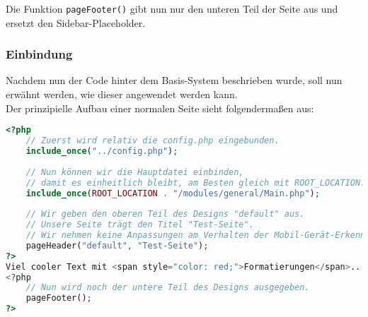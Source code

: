 
Die Funktion \texttt{pageFooter()} gibt nun nur den unteren Teil der Seite aus und ersetzt den Sidebar-Placeholder.

\subsubsection{Einbindung}
Nachdem nun der Code hinter dem Basis-System beschrieben wurde, soll nun erwähnt werden, wie dieser angewendet werden kann.\\
Der prinzipielle Aufbau einer normalen Seite sieht folgendermaßen aus:
\begin{lstlisting}[style=custom, language=php, caption={Anwendung des Basis-Systems},label={lst:content_imple_base_apply}]
<?php 
	// Zuerst wird relativ die config.php eingebunden.
	include_once("../config.php");
	
	// Nun können wir die Hauptdatei einbinden, 
	// damit es einheitlich bleibt, am Besten gleich mit ROOT_LOCATION.
	include_once(ROOT_LOCATION . "/modules/general/Main.php");
	
	// Wir geben den oberen Teil des Designs "default" aus.
	// Unsere Seite trägt den Titel "Test-Seite".
	// Wir nehmen keine Anpassungen am Verhalten der Mobil-Gerät-Erkennung vor.
	pageHeader("default", "Test-Seite");
?>
Viel cooler Text mit <span style="color: red;">Formatierungen</span>...
<?php
	// Nun wird noch der untere Teil des Designs ausgegeben.
	pageFooter();
?>
\end{lstlisting}
